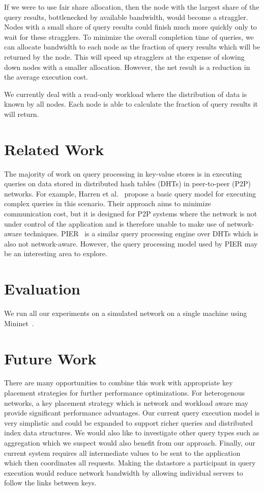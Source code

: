 \documentclass{sig-alternate-2013}
\begin{document}
If we were to use fair share allocation, then the node with the largest share of the query results, bottlenecked by available bandwidth, would become a straggler.
Nodes with a small share of query results could finish much more quickly only to wait for these stragglers.
To minimize the overall completion time of queries, we can allocate bandwidth to each node as the fraction of query results which will be returned by the node.
This will speed up stragglers at the expense of slowing down nodes with a smaller allocation.
However, the net result is a reduction in the average execution cost.

We currently deal with a read-only workload where the distribution of data is known by all nodes.
Each node is able to calculate the fraction of query results it will return.

\section{Related Work}

The majority of work on query processing in key-value stores is in executing queries on data stored in distributed hash tables (DHTs) in peer-to-peer (P2P) networks.
For example, Harren et al.~\cite{Harren2002} propose a basic query model for executing complex queries in this scenario.
Their approach aims to minimize communication cost, but it is designed for P2P systems where the network is not under control of the application and is therefore unable to make use of network-aware techniques.
PIER~\cite{Huebsch2005} is a similar query processing engine over DHTs which is also not network-aware.
However, the query processing model used by PIER may be an interesting area to explore.

\section{Evaluation}

We run all our experiments on a simulated network on a single machine using Mininet~\cite{Lantz2010}.

\section{Future Work}

There are many opportunities to combine this work with appropriate key placement strategies for further performance optimizations.
For heterogenous networks, a key placement strategy which is network and workload aware may provide significant performance advantages.
Our current query execution model is very simplistic and could be expanded to support richer queries and distributed index data structures.
We would also like to investigate other query types such as aggregation which we suspect would also benefit from our approach.
Finally, our current system requires all intermediate values to be sent to the application which then coordinates all requests.
Making the datastore a participant in query execution would reduce network bandwidth by allowing individual servers to follow the links between keys.
\end{document}
